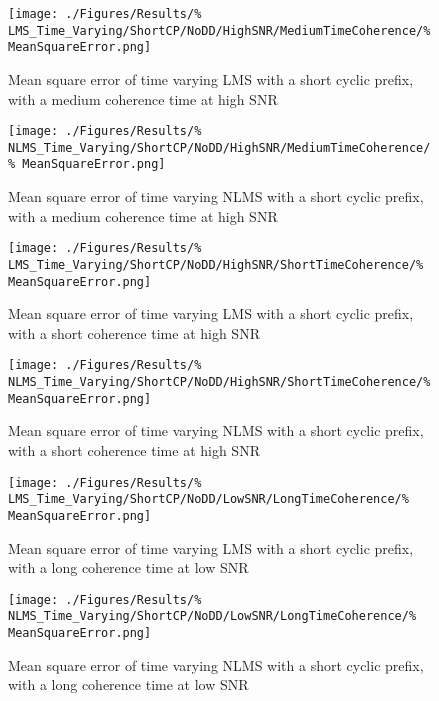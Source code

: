 \begin{figure}[ht]
	\centering
	\begin{minipage}{0.49\textwidth}
		\centering
		\texttt{[image: ./Figures/Results/\%
	LMS\_Time\_Varying/ShortCP/NoDD/HighSNR/MediumTimeCoherence/\%
	MeanSquareError.png]}
		\captionsetup{width=0.75\linewidth}
		\caption{Mean square error of time varying LMS with a 
		short cyclic prefix, with a medium coherence time at 
		high SNR}
	\end{minipage}
	\begin{minipage}{0.49\textwidth}
		\centering
		\texttt{[image: ./Figures/Results/\%
	NLMS\_Time\_Varying/ShortCP/NoDD/HighSNR/MediumTimeCoherence/\%
	MeanSquareError.png]}
		\captionsetup{width=0.75\linewidth}
		\caption{Mean square error of time varying NLMS with 
		a short cyclic prefix, with a medium coherence 
		time at high SNR}
	\end{minipage}
\end{figure}

\begin{figure}[ht]
	\centering
	\begin{minipage}{0.49\textwidth}
		\centering
		\texttt{[image: ./Figures/Results/\%
	LMS\_Time\_Varying/ShortCP/NoDD/HighSNR/ShortTimeCoherence/\%
	MeanSquareError.png]}
		\captionsetup{width=0.75\linewidth}
		\caption{Mean square error of time varying LMS with a 
		short cyclic prefix, with a short coherence time at 
		high SNR}
	\end{minipage}
	\begin{minipage}{0.49\textwidth}
		\centering
		\texttt{[image: ./Figures/Results/\%
	NLMS\_Time\_Varying/ShortCP/NoDD/HighSNR/ShortTimeCoherence/\%
	MeanSquareError.png]}
		\captionsetup{width=0.75\linewidth}
		\caption{Mean square error of time varying NLMS with 
		a short cyclic prefix, with a short coherence time 
		at high SNR}
	\end{minipage}
\end{figure}

\begin{figure}[ht]
	\centering
	\begin{minipage}{0.49\textwidth}
		\centering
		\texttt{[image: ./Figures/Results/\%
	LMS\_Time\_Varying/ShortCP/NoDD/LowSNR/LongTimeCoherence/\%
	MeanSquareError.png]}
		\captionsetup{width=0.75\linewidth}
		\caption{Mean square error of time varying LMS with a 
		short cyclic prefix, with a long coherence time at 
		low SNR}
	\end{minipage}
	\begin{minipage}{0.49\textwidth}
		\centering
		\texttt{[image: ./Figures/Results/\%
	NLMS\_Time\_Varying/ShortCP/NoDD/LowSNR/LongTimeCoherence/\%
	MeanSquareError.png]}
		\captionsetup{width=0.75\linewidth}
		\caption{Mean square error of time varying NLMS with 
		a short cyclic prefix, with a long coherence time 
		at low SNR}
	\end{minipage}
\end{figure}

